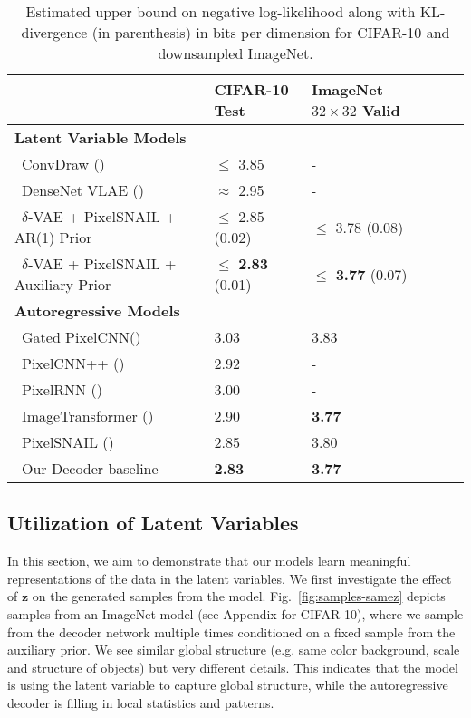 \documentclass{article} \usepackage{iclr2019_conference,times}
\def\figref#1{figure~\ref{#1}}
\def\rvz{{\mathbf{z}}}
\renewcommand{\figref}[1]{Fig.~\ref{#1}}
\begin{document}
\begin{table}[ht]
\centering
\begin{tabular}{@{}l|llll@{}}
          & \textbf{CIFAR-10 Test} & \textbf{ImageNet $32\times32$ Valid}  \\ \hline \textbf{Latent Variable Models} & & \\
\,\,\,ConvDraw (\cite{ConvDraw})                           &  $\leq$ 3.85  &  -    \\
\,\,\,DenseNet VLAE (\cite{VLAE})                      &  $\approx$ 2.95         &  -    \\
\,\,\,$\delta$-VAE + PixelSNAIL + AR(1) Prior             &  $\leq$ 2.85 (0.02)   &  $\leq$ 3.78 (0.08) \\
\,\,\,$\delta$-VAE + PixelSNAIL + Auxiliary Prior         &  $\leq$ \textbf{2.83} (0.01)  &  $\leq$ \textbf{3.77} (0.07) \\
\hline \textbf{Autoregressive Models} & & \\
\,\,\,Gated PixelCNN(\cite{pixelcnn})     &  3.03         &  3.83    \\
\,\,\,PixelCNN++ (\cite{PixelCNN++})      &  2.92         &  -    \\
\,\,\,PixelRNN   (\cite{PixelRNN})        &  3.00         &  -    \\
\,\,\,ImageTransformer (\cite{ImageTransformer}) &  2.90         &  \textbf{3.77}    \\
\,\,\,PixelSNAIL (\cite{PixelSnail})      &  2.85         &  3.80    \\
\hline
\,\,\,Our Decoder baseline                &  \textbf{2.83} & \textbf{3.77} \\ 

\bottomrule
\end{tabular}
\caption{ Estimated upper bound on negative log-likelihood along with KL-divergence (in parenthesis) in bits per dimension for CIFAR-10 and downsampled ImageNet.}
\label{tbl:nll}
\end{table}


\subsection{Utilization of Latent Variables}
In this section, we aim to demonstrate that our models learn meaningful representations of the data in the latent variables. We first investigate the effect of $\rvz$ on the generated samples from the model. \figref{fig:samples-samez} depicts samples from an ImageNet model (see Appendix for CIFAR-10), where we sample from the decoder network multiple times conditioned on a fixed sample from the auxiliary prior. We see similar global structure (e.g. same color background, scale and structure of objects) but very different details. This indicates that the model is using the latent variable to capture global structure, while the autoregressive decoder is filling in local statistics and patterns.
\end{document}
